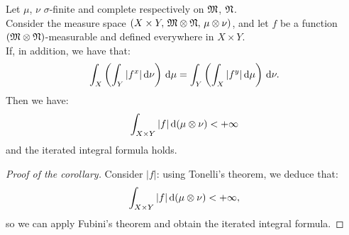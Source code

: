 %
%	

\begin{coro}
	Let $\mu$, $\nu$ $\sigma$-finite and complete respectively on $\mathfrak M$, $\mathfrak N$. \\
	Consider the measure space $(X\times Y,\, \mathfrak M \otimes \mathfrak N,\, \mu \otimes \nu)$, and let $f$ be a function $(\mathfrak M \otimes \mathfrak N)$-measurable and defined everywhere in $X\times Y$.\\
	If, in addition, we have that:
	$$
	\int_X \left( \int_Y |f^x| \,\mathrm d \nu \right) \,\mathrm d \mu
	= \int_Y \left( \int_X |f^y| \,\mathrm d \mu \right) \,\mathrm d \nu
	.
	$$
	Then we have:
	$$\int_{X \times Y} |f| \,\mathrm d (\mu \otimes \nu) < +\infty$$
	and the iterated integral formula holds.
\end{coro}
\begin{proof}[Proof of the corollary]
	Consider $|f|$: using Tonelli's theorem, we deduce that:
	$$\int_{X \times Y} |f| \,\mathrm d (\mu \otimes \nu) < +\infty,$$
	so we can apply Fubini's theorem and obtain the iterated integral formula.
\end{proof}

